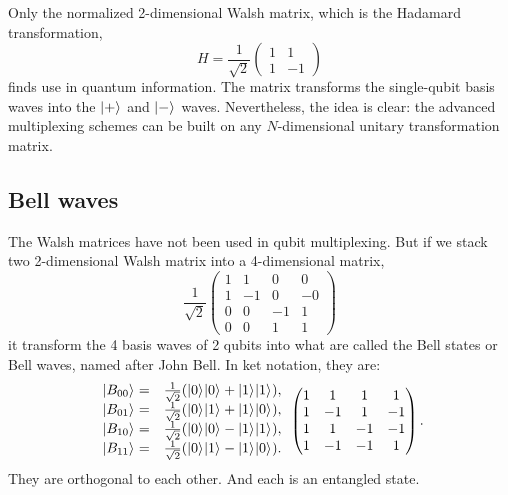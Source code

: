 \documentclass[oneside, letter, 12pt]{book}
\begin{document}
Only the normalized 2-dimensional Walsh matrix, which is the Hadamard transformation,
\begin{equation}
    H = \frac 1 {\sqrt{2}}
    \begin{pmatrix}
    1 & 1  \\
    1 & -1  
    \end{pmatrix}
\end{equation}
finds use in quantum information. The matrix transforms the single-qubit basis waves into the $\vert {+} \rangle_{}$ and $\vert {-} \rangle_{}$ waves. Nevertheless, the idea is clear: the advanced multiplexing schemes can be built on any $N$-dimensional unitary transformation matrix.

\subsection{Bell waves}
The Walsh matrices have not been used in qubit multiplexing. But if we stack two 2-dimensional Walsh matrix into a 4-dimensional matrix,
\begin{equation}
\frac 1 {\sqrt{2}}
  \begin{pmatrix}
    1 & 1 & 0 & 0 \\
    1 & -1 & 0 & -0 \\
    0 & 0 & -1 & 1 \\
    0 & 0 & 1 & 1
    \end{pmatrix}
\end{equation}
it transform the 4 basis waves of 2 qubits into what are called the Bell states or Bell waves, named after John Bell. In ket notation, they are:
\begin{equation}
\begin{array}{rl}
    \keta{B_{00}} =& \frac 1 {\sqrt 2} (\keta{0}\keta{0}+\keta{1}\keta{1}),\\
    \keta{B_{01}} =& \frac 1 {\sqrt 2} (\keta{0}\keta{1}+\keta{1}\keta{0}),\\
    \keta{B_{10}} =& \frac 1 {\sqrt 2} (\keta{0}\keta{0}-\keta{1}\keta{1}),\\
    \keta{B_{11}} =& \frac 1 {\sqrt 2} (\keta{0}\keta{1}-\keta{1}\keta{0}).
\end{array}

\begin{pmatrix} %
    1 & 1 & 1 & 1 \\
    1 & -1 & 1 & -1 \\
    1 & 1 & -1 & -1 \\
    1 & -1 & -1 & 1
    \end{pmatrix}.
\end{equation}
They are orthogonal to each other. And each is an entangled state.
\end{document}
